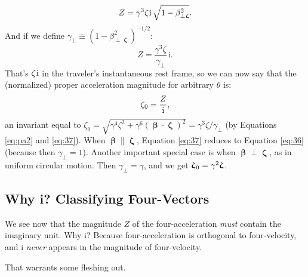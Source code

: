 \documentclass[12pt]{article}
\newcommand{\vvbeta}{\bm{\upbeta}}
\newcommand{\vvzeta}{\bm{\upzeta}}
\begin{document}
\begin{equation*}
Z = \gamma^3 \zeta \mkern1mu \mathrm{i} \, \sqrt{1 - \beta_{\perp \vvzeta}^2}.
\end{equation*}
And if we define $\gamma_{\perp} \equiv (1 - \beta_{\perp \vvzeta}^2)^{-1/2}$:
\begin{equation}\label{eq:37}
Z = \frac{\gamma^3 \zeta}{\gamma_{\perp}} \, \mathrm{i}.
\end{equation}
That's $\zeta \mkern1mu \mathrm{i}$ in the traveler's instantaneous rest frame, so we can now say that the (normalized) proper acceleration magnitude for arbitrary $\theta$ is:
\begin{equation}\label{eq:pa4}
\zeta_{\mkern1mu 0} = \dfrac{Z}{\mathrm{i}} ,
\end{equation}
an invariant equal to $\zeta_0 = \sqrt{\gamma^4 \zeta^2 + \gamma^6 (\vvbeta \cdot \vvzeta)^2} = \gamma^3 \zeta / \gamma_{\perp}$ (by Equations \ref{eq:pa2} and \ref{eq:37}). When $\vvbeta \parallel \vvzeta$, Equation \ref{eq:37} reduces to Equation \ref{eq:36} (because then $\gamma_{\perp} = 1$). Another important special case is when $\vvbeta \perp \vvzeta$, as in uniform circular motion. Then $\gamma_{\perp} = \gamma$, and we get $\vvzeta_{\mkern1mu 0} = \gamma^2 \vvzeta$.


\subsection{Why i? Classifying Four-Vectors}\label{sssec:classifying}

We see now that the magnitude $Z$ of the four-acceleration \emph{must} contain the imaginary unit. Why $\mathrm{i}$? Because four-acceleration is orthogonal to four-velocity, and $\mathrm{i}$ \emph{never} appears in the magnitude of four-velocity.

That warrants some fleshing out.
\end{document}

